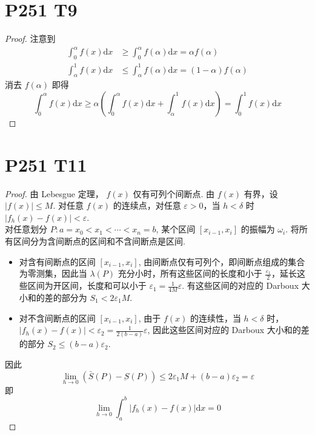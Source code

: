 \documentclass{article}
\newcommand{\dd}{\mathrm{d}}
\newcommand{\dx}{\dd x}
\begin{document}
\section*{P251 T9}

\begin{proof}
    注意到 
    \begin{align*}
        \int_{0}^{\alpha}f(x)\dx &\geqslant \int_{0}^{\alpha}f(\alpha)\dx = \alpha f(\alpha) \\
        \int_{\alpha}^{1}f(x)\dx &\leqslant \int_{\alpha}^{1}f(\alpha)\dx = (1 - \alpha)f(\alpha)
    \end{align*}
    消去 $f(\alpha)$ 即得 
    \[
        \int_{0}^{\alpha}f(x)\dx \geqslant \alpha\left( \int_{0}^{\alpha}f(x)\dx + \int_{\alpha}^{1}f(x)\dx\right) = \int_{0}^{1}f(x)\dx
    \]
\end{proof}

\section*{P251 T11}

\begin{proof}
    由 Lebesgue 定理， $f(x)$ 仅有可列个间断点. 由 $f(x)$ 有界，设 $\left\lvert f(x)\right\rvert \leqslant M$. 对任意 $f(x)$ 的连续点，对任意 $\varepsilon > 0$，当 $h < \delta$ 时 $\left\lvert f_h(x) - f(x)\right\rvert < \varepsilon$. \\
    对任意划分 $P: a = x_0 < x_1 < \cdots < x_n = b$, 某个区间 $[x_{i - 1}, x_i]$ 的振幅为 $\omega_i$. 将所有区间分为含间断点的区间和不含间断点是区间. 
    \begin{itemize}
        \item 对含有间断点的区间 $[x_{i - 1}, x_i]$, 由间断点仅有可列个，即间断点组成的集合为零测集，因此当 $\lambda(P)$ 充分小时，所有这些区间的长度和小于 $\frac{\varepsilon_1}{2}$，延长这些区间为开区间，长度和可以小于 $\varepsilon_1 = \frac{1}{4M}\varepsilon$. 有这些区间的对应的 Darboux 大小和的差的部分为 $S_1 < 2\varepsilon_1 M$.
        \item 对不含间断点的区间 $[x_{i - 1}, x_i]$, 由于 $f(x)$ 的连续性，当 $h < \delta$ 时， $\left\lvert f_h(x) - f(x)\right\rvert < \varepsilon_2 = \frac{1}{2(b - a)}\varepsilon$, 因此这些区间对应的 Darboux 大小和的差的部分 $S_2 \leqslant (b - a)\varepsilon_2$.
    \end{itemize}
    因此
    \[
        \lim_{h \to 0}\left(\bar{S}(P) - \underbar{S}(P)\right) \leqslant 2 \varepsilon_1 M + (b - a)\varepsilon_2 = \varepsilon
    \]
    即
    \[
        \lim_{h \to 0}\int_{a}^{b}\left\lvert f_h(x) - f(x)\right\rvert \dx = 0
    \]
\end{proof}
\end{document}
